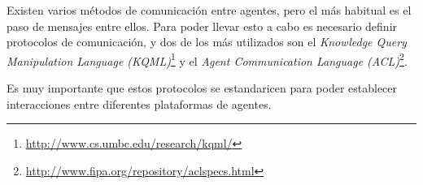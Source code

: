 Existen varios métodos de comunicación entre agentes, pero el más habitual es
el paso de mensajes entre ellos. Para poder llevar esto a cabo es necesario
definir protocolos de comunicación, y dos de los más utilizados son el {\em
Knowledge Query Manipulation Language
(KQML)}\footnote{\url{http://www.cs.umbc.edu/research/kqml/}} y el {\em Agent
Communication Language
(ACL)}\footnote{\url{http://www.fipa.org/repository/aclspecs.html}}.

Es muy importante que estos protocolos se estandaricen para poder establecer
interacciones entre diferentes plataformas de agentes.

